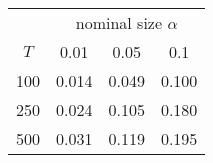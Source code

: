 % 
\begin{tabular}{cccc}
  \hline
  & \multicolumn{3}{c}{nominal size $\alpha$} \\
 $T$ & 0.01 & 0.05 & 0.1 \\
 \hline
100 & 0.014 & 0.049 & 0.100 \\ 
  250 & 0.024 & 0.105 & 0.180 \\ 
  500 & 0.031 & 0.119 & 0.195 \\ 
   \hline
\end{tabular}
